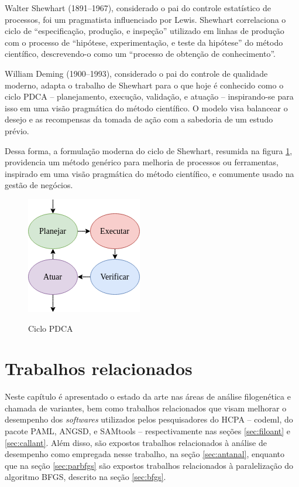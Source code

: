 \documentclass[cic,tc]{iiufrgs}
\begin{document}
Walter Shewhart (1891--1967), considerado o pai do controle estatístico de
processos, foi um pragmatista influenciado por Lewis. Shewhart correlaciona o
ciclo de ``especificação, produção, e inspeção'' utilizado em linhas de
produção com o processo de ``hipótese, experimentação, e teste da hipótese'' do
método científico, descrevendo-o como um ``processo de obtenção de
conhecimento''. 

William Deming (1900--1993), considerado o pai do controle de qualidade
moderno, adapta o trabalho de Shewhart para o que hoje é conhecido como o ciclo
PDCA -- planejamento, execução, validação, e atuação -- inspirando-se para
isso em uma visão pragmática do método científico. O modelo visa balancear o
desejo e as recompensas da tomada de ação com a sabedoria de um estudo prévio.

Dessa forma, a formulação moderna do ciclo de Shewhart, resumida na figura
\ref{fig:pdca_orig}, providencia um método genérico para melhoria de processos ou
ferramentas, inspirado em uma visão pragmática do método científico, e
comumente usado na gestão de negócios.

\begin{figure} \caption{Ciclo PDCA} \begin{center}
\includegraphics[width=0.25\linewidth]{img/pdca_orig.png} \end{center}
 \label{fig:pdca_orig} \end{figure}


%
%
%
%

\chapter{Trabalhos relacionados}
\label{chap:anteriores}

Neste capítulo é apresentado o estado da arte nas áreas de análise filogenética
e chamada de variantes, bem como trabalhos relacionados que visam melhorar o
desempenho dos \textit{softwares} utilizados pelos pesquisadores do HCPA --
codeml, do pacote PAML, ANGSD, e SAMtools -- respectivamente nas seções
\ref{sec:filoant} e \ref{sec:callant}. Além disso, são expostos trabalhos
relacionados à análise de desempenho como empregada nesse trabalho, na seção
\ref{sec:antanal}, enquanto que na seção \ref{sec:parbfgs} são expostos
trabalhos relacionados à paralelização do algoritmo BFGS, descrito na seção
\ref{sec:bfgs}.
\end{document}
